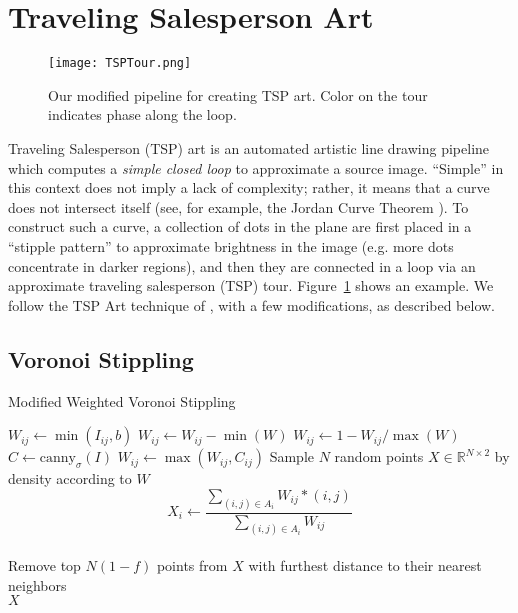 \documentclass[runningheads]{llncs}
\begin{document}
\section{Traveling Salesperson Art}

\begin{figure}
  \centering
  \texttt{[image: TSPTour.png]}
  \caption{Our modified pipeline for creating TSP art.  Color on the tour indicates phase along the loop.}
  \label{fig:TSPTour}
\end{figure}

Traveling Salesperson (TSP) art \cite{bosch2004continuous, kaplan2005tsp,bosch2008connecting} is an automated artistic line drawing pipeline which computes a {\em simple closed loop} to approximate a source image.  ``Simple'' in this context does not imply a lack of complexity; rather, it means that a curve does not intersect itself (see, for example, the Jordan Curve Theorem \cite{bosch2009jordan}).  To construct such a curve, a collection of dots in the plane are first placed in a ``stipple pattern'' to approximate brightness in the image (e.g. more dots concentrate in darker regions), and then they are connected in a loop via an approximate traveling salesperson (TSP) tour.  Figure~\ref{fig:TSPTour} shows an example.  We follow the TSP Art technique of \cite{kaplan2005tsp}, with a few modifications, as described below.


\subsection{Voronoi Stippling}
\label{sec:stippling}

\begin{algorithm}
  \caption{Modified Weighted Voronoi Stippling \cite{secord2002weighted}}
  \begin{algorithmic}[1]
    \State $W_{ij} \gets \min(I_{ij}, b)$
    \State $W_{ij} \gets W_{ij} - \min(W)$
    \State $W_{ij} \gets 1 - W_{ij} / \max(W)$
    \State $C \gets \text{canny}_{\sigma}(I)$ 
    \State $W_{ij} \gets \max(W_{ij}, C_{ij})$
    \State  Sample $N$ random points $X \in \mathbb{R}^{N \times 2}$ by density according to $W$
     
        \State \begin{equation}
          X_i \gets \frac{ \sum_{(i, j) \in A_i} W_{ij} * (i, j) }{\sum_{(i, j) \in A_i} W_{ij}}
        \end{equation}
    \EndFor \\
    \State Remove top $N(1-f)$ points from $X$ with furthest distance to their nearest neighbors \\
    \Return $X$
    \EndProcedure
  \end{algorithmic}
  \label{alg:voronoistipple}
\end{algorithm}
\end{document}
